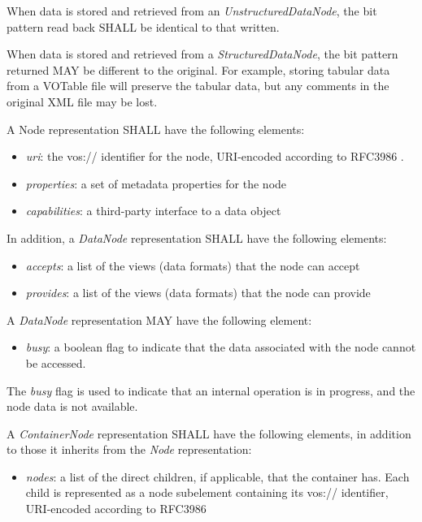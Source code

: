 \documentclass[11pt,a4paper]{ivoa}
\begin{document}
When data is stored and retrieved from an \emph{UnstructuredDataNode}, the bit pattern read back SHALL be identical to that written.

When data is stored and retrieved from a \emph{StructuredDataNode}, the bit pattern returned MAY be different to the original. For example, storing tabular data from a VOTable file will preserve the tabular data, but any comments in the original XML file may be lost.

A Node representation SHALL have the following elements:

\begin{itemize}
    \item \emph{uri}: the vos:// identifier for the node, URI-encoded according to RFC3986 \citep{std:RFC3986}.
    \item \emph{properties}: a set of metadata properties for the node
    \item \emph{capabilities}: a third-party interface to a data object
\end{itemize}

In addition, a \emph{DataNode} representation SHALL have the following elements:

\begin{itemize}
    \item \emph{accepts}: a list of the views (data formats) that the node can accept
    \item \emph{provides}: a list of the views (data formats) that the node can provide
\end{itemize}

A \emph{DataNode} representation MAY have the following element:

\begin{itemize}
    \item \emph{busy}: a boolean flag to indicate that the data associated with the node cannot be accessed.
\end{itemize}

The \emph{busy} flag is used to indicate that an internal operation is in progress, and the node data is not available.

A \emph{ContainerNode} representation SHALL have the following elements, in addition to those it inherits from the \emph{Node} representation:

\begin{itemize}
    \item \emph{nodes}: a list of the direct children, if applicable, that the container has. Each child is represented as a node subelement containing its vos:// identifier, URI-encoded according to RFC3986 \citep{std:RFC3986}
\end{itemize}
\end{document}
